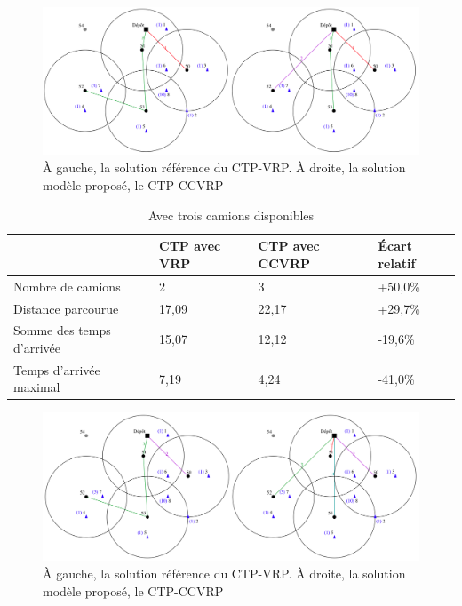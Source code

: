 \documentclass[12pt, a4paper, onecolumn, twoside,french,cleardoublepage=plain,openany]{article}
\begin{document}
\begin{figure}[H] \centering
	\centerline{\includegraphics[width=1.3\textwidth]{figures/trois_camions_combines}}
	\caption[]{À gauche, la solution référence du CTP-VRP. À droite, la solution modèle proposé, le CTP-CCVRP} \label{fig_trois_camions}
\end{figure}


\begin{table}[H] \centering \begin{tabular}{@{}llll@{}} \toprule %
 & CTP avec VRP & CTP avec CCVRP & Écart relatif \\ \midrule
Nombre de camions & 2 & 3 & +50,0\% \\
Distance parcourue & 17,09 & 22,17 & +29,7\% \\
Somme des temps d'arrivée & 15,07 & 12,12 & -19,6\% \\
Temps d'arrivée maximal & 7,19 & 4,24 & -41,0\% \\ \bottomrule
\end{tabular} \caption{Avec trois camions disponibles} \label{trois_camions}
\end{table}


\begin{figure}[H] \centering
	\centerline{\includegraphics[width=1.3\textwidth]{figures/quatre_camions_combines}}
	\caption[]{À gauche, la solution référence du CTP-VRP. À droite, la solution modèle proposé, le CTP-CCVRP} \label{fig_trois_camions}
\end{figure}
\end{document}

